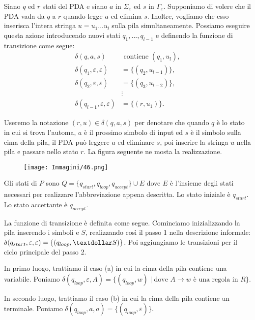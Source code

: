 \documentclass{article}
\begin{document}
Siano $q$ ed $r$ stati del PDA e siano $a$ in $\Sigma_\varepsilon$ ed $s$ in $\Gamma_\varepsilon$.
Supponiamo di volere che il PDA vada da $q$ a $r$ quando legge $a$ ed elimina $s$.
Inoltre, vogliamo che esso inserisca l'intera stringa $u = u_1...u_l$ sulla pila simultaneamente.
Possiamo eseguire questa azione introducendo nuovi stati $q_1,...,q_{l-1}$ e definendo la funzione di transizione come segue:
\[
\begin{aligned}
\delta(q,a,s) & \text{ contiene } (q_1,u_l), \\
\delta(q_1,\varepsilon,\varepsilon) & = \{(q_2,u_{l-1})\}, \\
\delta(q_2,\varepsilon,\varepsilon) & = \{(q_3,u_{l-2})\}, \\
& \vdots \\
\delta(q_{l-1},\varepsilon,\varepsilon) & = \{(r,u_1)\}.
\end{aligned}
\]

Useremo la notazione $(r,u) \in \delta(q,a,s)$ per denotare che quando $q$ è lo stato in cui si trova l'automa, $a$ è il prossimo simbolo di input ed $s$ è il simbolo sulla cima della pila, il PDA può leggere $a$ ed eliminare $s$, poi inserire la stringa $u$ nella pila e passare nello stato $r$. La figura seguente ne mosta la realizzazione.

\begin{figure}[H]
    \centering
    \texttt{[image: Immagini/46.png]}
    \label{fig:notation_example1}
\end{figure}

Gli stati di $P$ sono $Q = \{q_{start},q_{loop},q_{accept}\} \cup E$ dove $E$ è l'insieme degli stati necessari per realizzare l'abbreviazione appena descritta.
Lo stato iniziale è $q_{start}$. Lo stato accettante è $q_{accept}$.

La funzione di transizione è definita come segue. 
Cominciamo inizializzando la pila inserendo i simboli \textdollar e $S$, realizzando così il passo 1 nella descrizione informale:
$\delta(q_{start},\varepsilon,\varepsilon) = \{(q_{loop},\textdollar S)\}$.
Poi aggiungiamo le transizioni per il ciclo principale del passo 2.

In primo luogo, trattiamo il caso (a) in cui la cima della pila contiene una variabile.
Poniamo $\delta(q_{loop},\varepsilon,A) = \{(q_{loop},w) \mid \text{dove } A \rightarrow w \text{ è una regola in }R\}$.

In secondo luogo, trattiamo il caso (b) in cui la cima della pila contiene un terminale.
Poniamo $\delta(q_{loop},a,a) = \{(q_{loop},\varepsilon)\}$.
\end{document}
